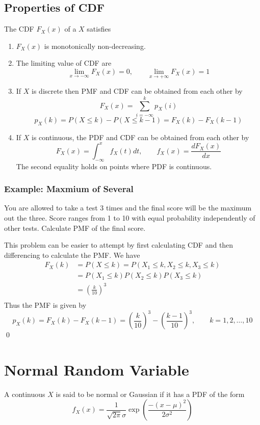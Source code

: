  \subsection{Properties of CDF}
 The CDF $F_X(x)$ of a \rv $X$ satisfies
 \begin{enumerate}
     \item $F_X(x)$ is monotonically non-decreasing.
     \item The limiting value of CDF are 
     \[\lim_{x \to -\infty}F_X(x) = 0, \qquad \lim_{x \to +\infty}F_X(x) = 1\]
     \item If $X$ is discrete then PMF and CDF can be obtained from each other by
     \[F_X(x)=\sum_{i=-\infty}^{k} p_X(i)\]
     \[p_X(k)=P(X\le k) - P(X\le k-1)=F_X(k)-F_X(k-1)\]
     \item If $X$ is continuous, the PDF and CDF can be obtained from each other by
     \[F_X(x)=\int_{-\infty}^{x}f_X(t) dt, \qquad f_X(x)=\frac{dF_X(x)}{dx}\]
     The second equality holds on points where PDF is continuous.
 \end{enumerate}

 \subsubsection{Example: Maxmium of Several \RV}
You are allowed to take a test 3 times and the final score will be the maximum out the three. Score ranges from 1 to 10 with equal probability independently of other tests. Calculate PMF of the final score.

This problem can be easier to attempt by first calculating CDF and then differencing to calculate the PMF. We have
\begin{align*}
    F_X(k) &= P(X \le k) = P(X_1 \le k, X_2 \le k, X_3 \le k) \\
           &= P(X_1 \le k)P(X_2 \le k)P(X_3 \le k) \\
           &= \left(\frac{k}{10}\right)^3 \\
\end{align*}
Thus the PMF is given by
\[p_X(k)=F_X(k)-F_X(k-1)=\left(\frac{k}{10}\right)^3 - \left(\frac{k-1}{10}\right)^3, \qquad k=1,2,\ldots, 10\]
\qed

\section{Normal Random Variable}
A continuous \rv $X$ is said to be normal or Gaussian if it has a PDF of the form
\[\boxed{ f_X(x) = \frac{1}{\sqrt{2\pi}\sigma}\exp\left({\frac{-(x-\mu)^2}{2\sigma^2}}\right) }\]

